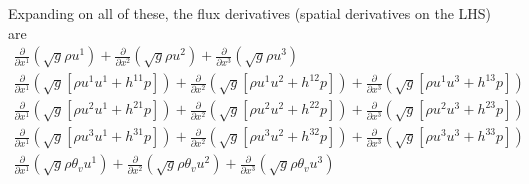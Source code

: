 \documentclass{article}
\begin{document}
Expanding on all of these, the flux derivatives (spatial derivatives on the LHS) are
\begin{align}
        \frac{\partial}{\partial x^1}\left( \sqrt{g}\rho u^1 \right)
      + \frac{\partial}{\partial x^2}\left( \sqrt{g}\rho u^2 \right)
      + \frac{\partial}{\partial x^3}\left( \sqrt{g}\rho u^3 \right) \\
        \frac{\partial}{\partial x^1}\left( \sqrt{g}\left[\rho u^1u^1+h^{11}p\right]\right)
      + \frac{\partial}{\partial x^2}\left( \sqrt{g}\left[\rho u^1u^2+h^{12}p\right]\right)
      + \frac{\partial}{\partial x^3}\left( \sqrt{g}\left[\rho u^1u^3+h^{13}p\right]\right) \\
        \frac{\partial}{\partial x^1}\left( \sqrt{g}\left[\rho u^2u^1+h^{21}p\right]\right)
      + \frac{\partial}{\partial x^2}\left( \sqrt{g}\left[\rho u^2u^2+h^{22}p\right]\right)
      + \frac{\partial}{\partial x^3}\left( \sqrt{g}\left[\rho u^2u^3+h^{23}p\right]\right) \\
        \frac{\partial}{\partial x^1}\left( \sqrt{g}\left[\rho u^3u^1+h^{31}p\right]\right)
      + \frac{\partial}{\partial x^2}\left( \sqrt{g}\left[\rho u^3u^2+h^{32}p\right]\right)
      + \frac{\partial}{\partial x^3}\left( \sqrt{g}\left[\rho u^3u^3+h^{33}p\right]\right) \\
        \frac{\partial}{\partial x^1}\left( \sqrt{g}\rho\theta_v u^1 \right)
      + \frac{\partial}{\partial x^2}\left( \sqrt{g}\rho\theta_v u^2 \right)
      + \frac{\partial}{\partial x^3}\left( \sqrt{g}\rho\theta_v u^3 \right)
\end{align}

\glsaddallunused
\printglossaries
\end{document}

